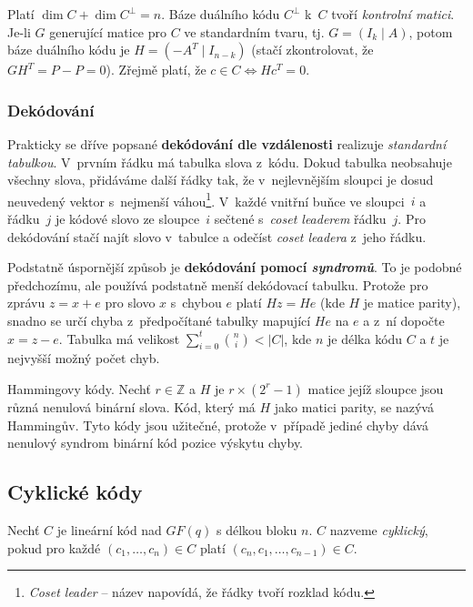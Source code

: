 Platí $\dim C + \dim C^\bot = n$.
Báze duálního kódu $C^\bot$ k~$C$ tvoří {\em kontrolní matici}.
Je-li $G$ generující matice pro $C$ ve standardním tvaru, tj.
$G = (I_k \mid A)$, potom báze duálního kódu je $H = (-A^T \mid I_{n - k})$
(stačí zkontrolovat, že $GH^T = P - P = 0$).
Zřejmě platí, že $c \in C \iff Hc^T = 0$.


\subsubsection{Dekódování}

Prakticky se dříve popsané {\bf dekódování dle vzdálenosti} realizuje
{\em standardní tabulkou}. V~prvním řádku má tabulka slova z~kódu. Dokud
tabulka neobsahuje všechny slova, přidáváme další řádky tak, že
v~nejlevnějším sloupci je dosud neuvedený vektor s~nejmenší
váhou\footnote{{\em Coset leader} -- název napovídá, že řádky tvoří
rozklad kódu.}. V~každé vnitřní buňce ve sloupci~$i$ a řádku~$j$ je
kódové slovo ze sloupce~$i$ sečtené s~{\em coset leaderem} řádku~$j$.
Pro dekódování stačí najít slovo v~tabulce a odečíst {\em coset leadera}
z~jeho řádku.

Podstatně úspornější způsob je {\bf dekódování pomocí {\em syndromů}}. To je
podobné předchozímu, ale používá podstatně menší dekódovací tabulku.
Protože pro zprávu $z = x + e$ pro slovo $x$ s~chybou $e$ platí
$Hz = He$ (kde $H$ je matice parity), snadno se určí chyba
z~předpočítané tabulky mapující $He$ na $e$ a z~ní dopočte $x = z -e$.
Tabulka má velikost $\sum_{i = 0}^{t} {n \choose i} < \lvert C \rvert$,
kde $n$ je délka kódu $C$ a $t$ je nejvyšší možný počet chyb.


\begin{example}
    Hammingovy kódy. Nechť $r \in \mathbb{Z}$ a $H$ je
    $r \times (2^r-1)$ matice jejíž sloupce jsou různá nenulová binární
    slova. Kód, který má $H$ jako matici parity, se nazývá Hammingův.
    Tyto kódy jsou užitečné, protože v~případě jediné chyby dává
    nenulový syndrom binární kód pozice výskytu chyby.
\end{example}

\subsection{Cyklické kódy}

\begin{definition}
    Nechť $C$ je lineární kód nad $GF(q)$ s délkou bloku $n$.
    $C$ nazveme {\em cyklický}, pokud pro každé $(c_1,\ldots,c_n) \in C$
    platí $(c_n,c_1,\ldots,c_{n-1}) \in C$.
\end{definition}

